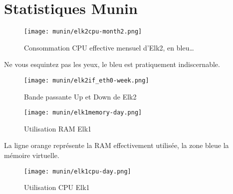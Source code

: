 \section{Statistiques Munin}
\begin{figure}[H]
\center
\texttt{[image: munin/elk2cpu-month2.png]}
\label{fig:elk2cpu}
\caption{Consommation CPU effective mensuel d'Elk2, en bleu\ldots}
\end{figure}
Ne vous esquintez pas les yeux, le bleu est pratiquement indiscernable.

\begin{figure}[H]
\center
\texttt{[image: munin/elk2if\_eth0-week.png]}
\label{fig:elk2eth0}
\caption{Bande passante Up et Down de Elk2}
\end{figure}
\begin{figure}[H]
\center
\texttt{[image: munin/elk1memory-day.png]}
\label{fig:elk1memory}
\caption{Utilisation RAM Elk1}
\end{figure}
La ligne orange représente la RAM effectivement utilisée, la zone bleue la mémoire virtuelle.
\begin{figure}[H]
\center
\texttt{[image: munin/elk1cpu-day.png]}
\label{fig:elk1cpu}
\caption{Utilisation CPU Elk1}
\end{figure}
